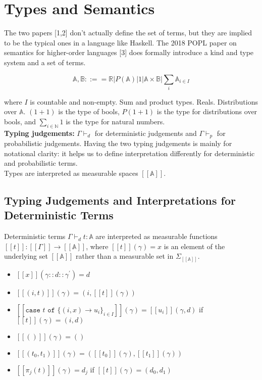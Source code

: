 \documentclass[11pt]{article}
\theoremstyle{definition}
\theoremstyle{plain}
\renewcommand{\b}[1]{\mathbb{#1}}
\begin{document}
\section{Types and Semantics}

\noindent The two papers [1,2] don't actually define the set of terms,
but they are implied to be the typical ones in a language like Haskell.
The 2018 POPL paper on semantics for higher-order languages [3] does formally
introduce a kind and type system and a set of terms.

$$ \b{A},\b{B} ::== 
    \b{R} | P(\b{A}) | 1 | \b{A} \times \b{B} | \sum_i \b{A}_{i \in I} $$

\noindent where $I$ is countable and non-empty. Sum and product types. 
Reals. Distributions over $\b{A}$. $(1+1)$ is the type of bools, 
$P(1+1)$ is the type for distributions over bools, and $\sum_{i \in \b{N}} 1$ 
is the type for natural numbers.\\

\noindent \textbf{Typing judgements:} $\Gamma \vdash_d$ for deterministic
judgements and $\Gamma \vdash_p$ for probabilistic judgements. Having the two
typing judgements is mainly for notational clarity: it helps us to define 
interpretation differently for deterministic and probabilistic terms. \\

\noindent Types are interpreted as measurable spaces $[[\b{A}]]$. 


\subsection{Typing Judgements and Interpretations for Deterministic Terms}

\noindent Deterministic terms 
$\Gamma \vdash_d t : \b{A}$ are interpreted
as measurable functions $[[t]]: [[\Gamma]] \rightarrow [[\b{A}]]$,
where $[[t]](\gamma) = x$ is an element of the underlying set
$[[\b{A}]]$ rather than a measurable set in $\Sigma_{[[\b{A}]]}$.

\begin{itemize}
  \item $[[x]](\gamma::d::\gamma^\prime) = d$
  \item $[[(i,t)]](\gamma) = (i,[[t]](\gamma))$
  \item $[[\texttt{case } t \texttt{ of } \{(i,x) 
         \rightarrow u_i\}_{i \in I}]](\gamma) = 
         [[u_i]](\gamma,d)$ if $[[t]](\gamma) = (i,d)$
  \item $[[()]](\gamma) = ()$
  \item $[[(t_0,t_1)]](\gamma) = ([[t_0]](\gamma),[[t_1]](\gamma))$
  \item $[[\pi_j(t)]](\gamma) = d_j$ if $[[t]](\gamma) = (d_0,d_1)$
\end{itemize}
\end{document}
